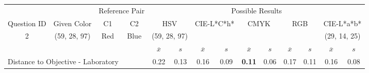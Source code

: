 \begin{table}[H]
  \resizebox{\textwidth}{!} {
  \begin{tabular}{lccccccccccccc}
    \hline
    \multicolumn{1}{c}{}                              &                                      & \multicolumn{2}{c}{Reference Pair}                   & \multicolumn{10}{c}{Possible Results}                                                                                                                                                                                                                                                                                        \\ \cline{3-14}
    \multicolumn{1}{c}{\multirow{-2}{*}{Question ID}} & \multirow{-2}{*}{Given Color}        & C1                       & C2                         & \multicolumn{2}{c}{HSV}                                        & \multicolumn{2}{c}{CIE-L*C*h*}                                 & \multicolumn{2}{c}{CMYK}                                       & \multicolumn{2}{c}{RGB}                                        & \multicolumn{2}{c}{CIE-L*a*b*}                                 \\ \hline
    \multicolumn{1}{c}{2}                             & \cellcolor[HTML]{FF00FF}(59, 28, 97) & \multicolumn{1}{c|}{Red} & \multicolumn{1}{c|}{Blue}  & \multicolumn{2}{c|}{\cellcolor[HTML]{FF00FF}(59, 28, 97)}      & \multicolumn{2}{c|}{\cellcolor[HTML]{FB0080}{\color[HTML]{FFFFFF}(44, 22, 22)}}       & \multicolumn{2}{c|}{\cellcolor[HTML]{800080}{\color[HTML]{FFFFFF}(13, 6, 21)}}       & \multicolumn{2}{c|}{\cellcolor[HTML]{800080}{\color[HTML]{FFFFFF}(13, 6, 21)}}       & \multicolumn{2}{c|}{\cellcolor[HTML]{CA0088}(29, 14, 25)}       \\ \hline
                                                      & \multicolumn{1}{l}{}                 & \multicolumn{1}{l}{}     & \multicolumn{1}{l}{}       & \multicolumn{1}{c}{$\overline{x}$} & \multicolumn{1}{c}{$s$} & \multicolumn{1}{c}{$\overline{x}$} & \multicolumn{1}{c}{$s$} & \multicolumn{1}{c}{$\overline{x}$} & \multicolumn{1}{c}{$s$} & \multicolumn{1}{c}{$\overline{x}$} & \multicolumn{1}{c}{$s$} & \multicolumn{1}{c}{$\overline{x}$} & \multicolumn{1}{c}{$s$} \\ \hline
    \multicolumn{4}{l}{Distance to Objective - Laboratory}                                                                                           & \multicolumn{1}{|c}{0.22}       & \multicolumn{1}{c|}{0.13}    & \multicolumn{1}{|c}{0.16}       & \multicolumn{1}{c|}{0.09}    & \multicolumn{1}{|c}{\textbf{0.11}}       & \multicolumn{1}{c|}{0.06}    & \multicolumn{1}{|c}{0.17}       & \multicolumn{1}{c|}{0.11}    & \multicolumn{1}{|c}{0.16}       & \multicolumn{1}{c|}{0.08}    \\

\end{tabular}}
\end{table}
